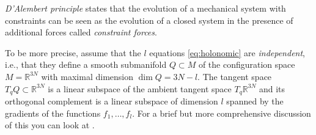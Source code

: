 \documentclass[english,fontsize=11pt,paper=b5]{scrbook}
\theoremstyle{definition}
\begin{document}
    \begin{tcolorbox}
      \emph{D'Alembert principle} states that the evolution of a mechanical system with constraints can be seen as the evolution of a closed system in the presence of additional forces called \emph{constraint forces}.
    \end{tcolorbox}

    To be more precise, assume that the $l$ equations \eqref{eq:holonomic} are \emph{independent}, i.e., that they define a smooth submanifold $Q\subset M$ of the configuration space $M=\mathbb{R}^{3N}$ with maximal dimension $\dim Q = 3N-l$.
    The tangent space $T_qQ \subset \mathbb{R}^{3N}$ is a linear subspace of the ambient tangent space $T_q \mathbb{R}^{3N}$ and its orthogonal complement is a linear subspace of dimension $l$ spanned by the gradients of the functions $f_1, \ldots, f_l$.
    For a brief but more comprehensive discussion of this you can look at \cite[Chapter 2.8]{lectures:aom:seri}.
\end{document}
